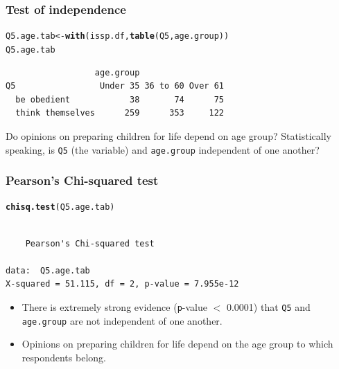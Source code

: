 \documentclass{beamer}\usepackage[]{graphicx}\usepackage[]{color}
\makeatletter
\newcommand{\hlstd}[1]{\textcolor[rgb]{0.345,0.345,0.345}{#1}}%
\newcommand{\hlkwb}[1]{\textcolor[rgb]{0.69,0.353,0.396}{#1}}%
\newcommand{\hlkwd}[1]{\textcolor[rgb]{0.737,0.353,0.396}{\textbf{#1}}}%
\newenvironment{kframe}{%
 \def\at@end@of@kframe{}%
 \ifinner\ifhmode%
  \def\at@end@of@kframe{\end{minipage}}%
  \begin{minipage}{\columnwidth}%
 \fi\fi%
 \def\FrameCommand##1{\hskip\@totalleftmargin \hskip-\fboxsep
 \colorbox{shadecolor}{##1}\hskip-\fboxsep
     \hskip-\linewidth \hskip-\@totalleftmargin \hskip\columnwidth}%
 \MakeFramed {\advance\hsize-\width
   \@totalleftmargin\z@ \linewidth\hsize
   \@setminipage}}%
 {\par\unskip\endMakeFramed%
 \at@end@of@kframe}
\newenvironment{knitrout}{}{} %
\makeatother
\begin{document}

\begin{frame}[fragile]
  \frametitle{Test of independence}
\begin{knitrout}
\color{fgcolor}\begin{kframe}
\begin{alltt}
\hlstd{Q5.age.tab} \hlkwb{<-} \hlkwd{with}\hlstd{(issp.df,} \hlkwd{table}\hlstd{(Q5, age.group))}
\hlstd{Q5.age.tab}
\end{alltt}
\begin{verbatim}
                  age.group
Q5                 Under 35 36 to 60 Over 61
  be obedient            38       74      75
  think themselves      259      353     122
\end{verbatim}
\end{kframe}
\end{knitrout}
Do opinions on preparing children for life depend on age group? Statistically speaking, is \texttt{Q5} (the variable) and \texttt{age.group} independent of one another?
\end{frame} 

\begin{frame}[fragile]
  \frametitle{Pearson's Chi-squared test}
\begin{knitrout}
\color{fgcolor}\begin{kframe}
\begin{alltt}
\hlkwd{chisq.test}\hlstd{(Q5.age.tab)}
\end{alltt}
\begin{verbatim}

	Pearson's Chi-squared test

data:  Q5.age.tab
X-squared = 51.115, df = 2, p-value = 7.955e-12
\end{verbatim}
\end{kframe}
\end{knitrout}
\begin{itemize}
\item There is extremely strong evidence (\texttt{p}-value $<$ 0.0001) that \texttt{Q5} and \texttt{age.group} are not independent of one another.
\item Opinions on preparing children for life depend on the age group to which respondents belong.
\end{itemize}
\end{frame} 
\end{document}
